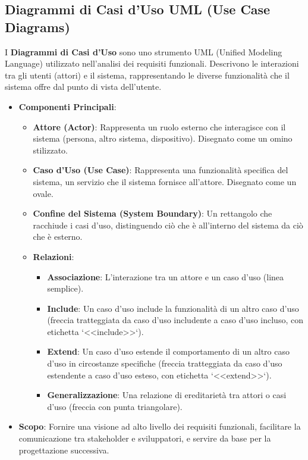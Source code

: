 \subsection{Diagrammi di Casi d'Uso UML (Use Case Diagrams)}
I \textbf{Diagrammi di Casi d'Uso} sono uno strumento UML (Unified Modeling Language) utilizzato nell'analisi dei requisiti funzionali. Descrivono le interazioni tra gli utenti (attori) e il sistema, rappresentando le diverse funzionalità che il sistema offre dal punto di vista dell'utente.
\begin{itemize}
    \item \textbf{Componenti Principali}:
    \begin{itemize}
        \item \textbf{Attore (Actor)}: Rappresenta un ruolo esterno che interagisce con il sistema (persona, altro sistema, dispositivo). Disegnato come un omino stilizzato.
        \item \textbf{Caso d'Uso (Use Case)}: Rappresenta una funzionalità specifica del sistema, un servizio che il sistema fornisce all'attore. Disegnato come un ovale.
        \item \textbf{Confine del Sistema (System Boundary)}: Un rettangolo che racchiude i casi d'uso, distinguendo ciò che è all'interno del sistema da ciò che è esterno.
        \item \textbf{Relazioni}:
        \begin{itemize}
            \item \textbf{Associazione}: L'interazione tra un attore e un caso d'uso (linea semplice).
            \item \textbf{Include}: Un caso d'uso include la funzionalità di un altro caso d'uso (freccia tratteggiata da caso d'uso includente a caso d'uso incluso, con etichetta `<<include>>`).
            \item \textbf{Extend}: Un caso d'uso estende il comportamento di un altro caso d'uso in circostanze specifiche (freccia tratteggiata da caso d'uso estendente a caso d'uso esteso, con etichetta `<<extend>>`).
            \item \textbf{Generalizzazione}: Una relazione di ereditarietà tra attori o casi d'uso (freccia con punta triangolare).
        \end{itemize}
    \end{itemize}
    \item \textbf{Scopo}: Fornire una visione ad alto livello dei requisiti funzionali, facilitare la comunicazione tra stakeholder e sviluppatori, e servire da base per la progettazione successiva.
\end{itemize}

